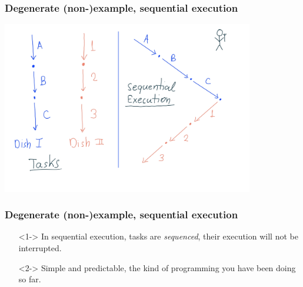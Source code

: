 \documentclass[xcolor={dvipsnames,svgnames},aspectratio=169]{beamer}
\begin{document}
\begin{frame}[fragile]
  \frametitle{Degenerate (non-)example, sequential execution}

  \begin{center}
    \includegraphics[width=11cm,keepaspectratio]{media/lecture1-seq.png}
  \end{center}


\end{frame}

\begin{frame}[fragile]
  \frametitle{Degenerate (non-)example, sequential execution}

  \large{
    \begin{itemize}
    \item[\faBook]<1-> In sequential execution, tasks are \emph{sequenced},
      their execution will not be interrupted.
    \item[\faBook]<2-> Simple and predictable, the kind of programming you have
      been doing so far.
    \end{itemize}}

\end{frame}
\end{document}
